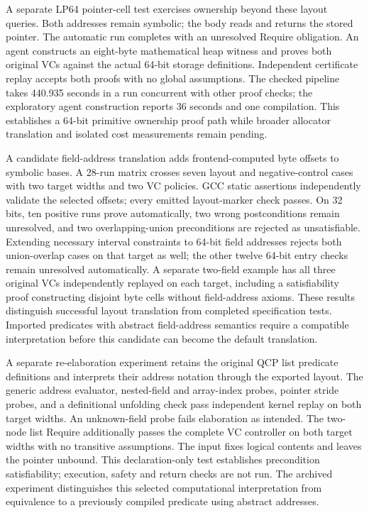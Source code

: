 A separate LP64 pointer-cell test exercises ownership beyond these layout
queries. Both addresses remain symbolic; the body reads and returns the stored
pointer. The automatic run completes with an unresolved Require obligation.
An agent constructs an eight-byte mathematical heap witness and proves both
original VCs against the actual 64-bit storage definitions. Independent
certificate replay accepts both proofs with no global assumptions. The checked
pipeline takes 440.935 seconds in a run concurrent with other proof checks;
the exploratory agent construction reports 36 seconds and one compilation.
This establishes a 64-bit primitive ownership proof path while broader
allocator translation and isolated cost measurements remain pending.

A candidate field-address translation adds frontend-computed byte offsets to
symbolic bases. A 28-run matrix crosses seven layout and negative-control
cases with two target widths and two VC policies. GCC static assertions
independently validate the selected offsets; every emitted layout-marker check
passes. On 32 bits, ten positive runs prove automatically, two wrong
postconditions remain unresolved, and two overlapping-union preconditions are
rejected as unsatisfiable. Extending necessary interval constraints to 64-bit
field addresses rejects both union-overlap cases on that target as well;
the other twelve 64-bit entry checks remain unresolved automatically.
A separate two-field example has all three original VCs independently replayed
on each target, including a satisfiability proof constructing disjoint
byte cells without field-address axioms. These results distinguish successful
layout translation from completed specification tests. Imported predicates
with abstract field-address semantics require a compatible interpretation
before this candidate can become the default translation.

A separate re-elaboration experiment retains the original QCP list predicate
definitions and interprets their address notation through the exported layout.
The generic address evaluator, nested-field and array-index probes, pointer
stride probes, and a definitional unfolding check pass independent kernel replay
on both target widths. An unknown-field probe fails elaboration as intended.
The two-node list Require additionally passes the complete VC controller on
both target widths with no transitive assumptions. The input fixes logical contents and leaves
the pointer unbound. This declaration-only test establishes precondition
satisfiability; execution, safety and return checks are not run. The archived
experiment distinguishes this selected computational interpretation from
equivalence to a previously compiled predicate using abstract addresses.

